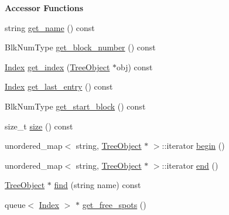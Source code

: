 \begin{Indent}{\bf Accessor Functions}\par
\begin{DoxyCompactItemize}
\item 
string \hyperlink{classTreeObject_aefb8b561cf2b7affb284ee2973ab037d}{get\+\_\+name} () const 
\item 
Blk\+Num\+Type \hyperlink{classTreeObject_a0c2daa96d6faac0eb608232768e5bfc6}{get\+\_\+block\+\_\+number} () const 
\item 
\hyperlink{structindex}{Index} \hyperlink{classTreeObject_a10da407a9f517749ea0dbaa1092c2a05}{get\+\_\+index} (\hyperlink{classTreeObject}{Tree\+Object} $\ast$obj) const 
\item 
\hyperlink{structindex}{Index} \hyperlink{classTreeObject_a5e216801cf6bd6c43a5f480ed0d61dce}{get\+\_\+last\+\_\+entry} () const 
\item 
Blk\+Num\+Type \hyperlink{classTreeObject_ac50bd3fd41b9361d8de3f7b34d2b4ef7}{get\+\_\+start\+\_\+block} () const 
\item 
size\+\_\+t \hyperlink{classTreeObject_af996b31255254d3323b9301386045271}{size} () const 
\item 
unordered\+\_\+map$<$ string, \hyperlink{classTreeObject}{Tree\+Object} $\ast$ $>$\+::iterator \hyperlink{classTreeObject_af8bb5e54c0a13e1e0e5be409153ab6d8}{begin} ()
\item 
unordered\+\_\+map$<$ string, \hyperlink{classTreeObject}{Tree\+Object} $\ast$ $>$\+::iterator \hyperlink{classTreeObject_a2544e2976f3b75cd1f0230f5f908059c}{end} ()
\item 
\hyperlink{classTreeObject}{Tree\+Object} $\ast$ \hyperlink{classTreeObject_a4c06b0abca3dafa6b10ed8bd8e64c415}{find} (string name) const 
\item 
queue$<$ \hyperlink{structindex}{Index} $>$ $\ast$ \hyperlink{classTreeObject_aa0900ad50c10023e4700f11218d30d7a}{get\+\_\+free\+\_\+spots} ()
\end{DoxyCompactItemize}
\end{Indent}
